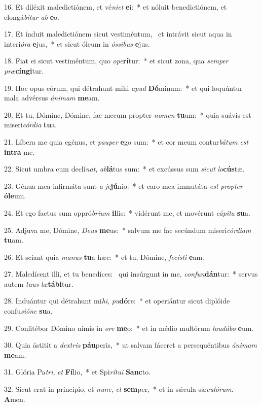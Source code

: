 16. Et diléxit maledictiónem, et vé\textit{ni}\textit{et} \textbf{e}i:~*  et nóluit benedictiónem, et elongá\textit{bi}\textit{tur} \textit{ab} \textbf{e}o.\

17. Et índuit maledictiónem sicut vestiméntum, \dag\  et intrávit sicut aqua in interi\textit{ó}\textit{ra} \textbf{e}jus,~*  et sicut óleum in \textit{ós}\textit{si}\textit{bus} \textbf{e}jus.\

18. Fiat ei sicut vestiméntum, quo \textit{o}\textit{pe}\textbf{rí}tur:~*  et sicut zona, qua \textit{sem}\textit{per} \textit{præ}\textbf{cín}\textbf{gi}tur.\

19. Hoc opus eórum, qui détrahunt mihi \textit{a}\textit{pud} \textbf{Dó}minum:~*  et qui loquúntur mala advérsus \textit{á}\textit{ni}\textit{mam} \textbf{me}am.\

20. Et tu, Dómine, Dómine, fac mecum propter \textit{no}\textit{men} \textbf{tu}um:~*  quia suávis est miseri\textit{cór}\textit{di}\textit{a} \textbf{tu}a.\

21. Líbera me quia egénus, et \textit{pau}\textit{per} \textbf{e}go sum:~*  et cor meum contur\textit{bá}\textit{tum} \textit{est} \textbf{in}\textbf{tra} me.\

22. Sicut umbra cum declí\textit{nat}, \textit{ab}\textbf{lá}tus sum:~*  et excússus sum \textit{sic}\textit{ut} \textit{lo}\textbf{cús}tæ.\

23. Génua mea infirmáta sunt \textit{a} \textit{je}\textbf{jú}nio:~*  et caro mea immutáta \textit{est} \textit{prop}\textit{ter} \textbf{ó}\textbf{le}um.\

24. Et ego factus sum oppró\textit{bri}\textit{um} \textbf{il}lis:~*  vidérunt me, et movérunt \textit{cá}\textit{pi}\textit{ta} \textbf{su}a.\

25. Adjuva me, Dómine, \textit{De}\textit{us} \textbf{me}us:~*  salvum me fac secúndum miseri\textit{cór}\textit{di}\textit{am} \textbf{tu}am.\

26. Et sciant quia \textit{ma}\textit{nus} \textbf{tu}a hæc:~*  et tu, Dómine, \textit{fe}\textit{cís}\textit{ti} \textbf{e}am.\

27. Maledícent illi, et tu benedíces: \dag\  qui insúrgunt in me, \textit{con}\textit{fun}\textbf{dán}tur:~*  servus autem \textit{tu}\textit{us} \textit{læ}\textbf{tá}\textbf{bi}tur.\

28. Induántur qui détrahunt mi\textit{hi}, \textit{pu}\textbf{dó}re:~*  et operiántur sicut diplóide confu\textit{si}\textit{ó}\textit{ne} \textbf{su}a.\

29. Confitébor Dómino nimis in \textit{o}\textit{re} \textbf{me}o:~*  et in médio multórum \textit{lau}\textit{dá}\textit{bo} \textbf{e}um.\

30. Quia ástitit a \textit{dex}\textit{tris} \textbf{páu}peris,~*  ut salvam fáceret a persequéntibus \textit{á}\textit{ni}\textit{mam} \textbf{me}am.\

31. Glória Pa\textit{tri}, \textit{et} \textbf{Fí}lio,~*  et Spi\textit{rí}\textit{tu}\textit{i} \textbf{Sanc}to.\

32. Sicut erat in princípio, et \textit{nunc}, \textit{et} \textbf{sem}per,~*  et in sǽcula sæ\textit{cu}\textit{ló}\textit{rum}. \textbf{A}men.\


